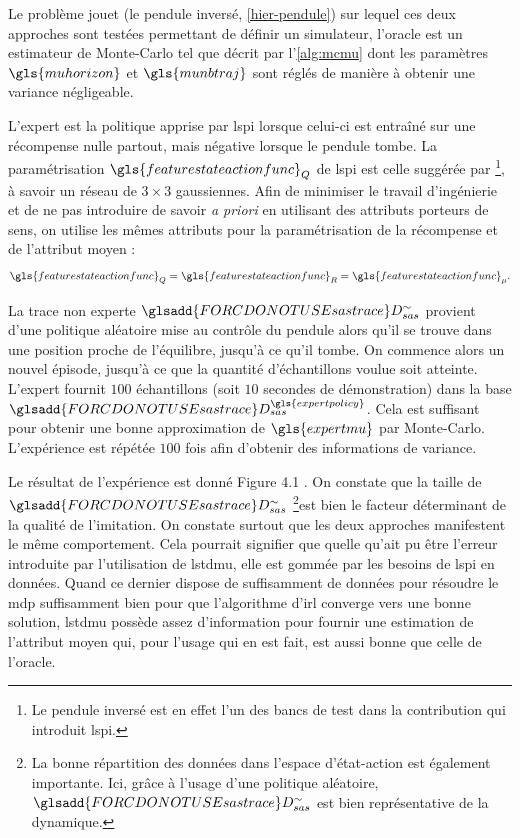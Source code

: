 \documentclass[frenchb,a4paper,justified,notoc]{tufte-book}
\newcommand{\expertmu}{\gls{expertmu}}
\newcommand{\expertpolicy}{\gls{expertpolicy}}
\newcommand{\munbtraj}{\gls{munbtraj}}
\newcommand{\muhorizon}{\gls{muhorizon}}
\newcommand{\featurestateactionfunc}{\gls{featurestateactionfunc}}
\newcommand{\sastrace}[1]{\ensuremath{\glsadd{FORCDONOTUSEsastrace}D_{sas}^{#1}}}
\begin{document}
Le problème jouet (le pendule inversé, \autoref{hier-pendule}) sur lequel ces deux approches sont testées permettant de définir un simulateur, l'oracle est un estimateur de Monte-Carlo tel que décrit par l'\autoref{alg:mcmu} dont les paramètres $\muhorizon$ et $\munbtraj$ sont réglés de manière à obtenir une variance négligeable.

L'expert est la politique apprise par \gls{lspi} lorsque celui-ci est entraîné sur une récompense nulle partout, mais négative lorsque le pendule tombe. La paramétrisation $\featurestateactionfunc_Q$ de \gls{lspi} est celle suggérée par \citet{lagoudakis2003least} \footnote{Le pendule inversé est en effet l'un des bancs de test dans la contribution qui introduit \gls{lspi}.
 }, à savoir un réseau de $3\times 3$ gaussiennes. Afin de minimiser le travail d'ingénierie et de ne pas introduire de savoir \emph{a priori} en utilisant des attributs porteurs de sens, on utilise les mêmes attributs pour la paramétrisation de la récompense et de l'attribut moyen :
\begin{equation}
\featurestateactionfunc_Q = \featurestateactionfunc_R = \featurestateactionfunc_\mu.
\end{equation}

La trace non experte $\sastrace{\sim}$ provient d'une politique aléatoire mise au contrôle du pendule alors qu'il se trouve dans une position proche de l'équilibre, jusqu'à ce qu'il tombe. On commence alors un nouvel épisode, jusqu'à ce que la quantité d'échantillons voulue soit atteinte. L'expert fournit $100$ échantillons (soit $10$ secondes de démonstration) dans la base $\sastrace{\expertpolicy}$. Cela est suffisant pour obtenir une bonne approximation de $\expertmu$ par Monte-Carlo. L'expérience est répétée $100$ fois afin d'obtenir des informations de variance.

 Le résultat de l'expérience est donné Figure 4.1
. On constate que la taille de $\sastrace{\sim}$ \footnote{La bonne répartition des données dans l'espace d'état-action est également importante. Ici, grâce à l'usage d'une politique aléatoire, $\sastrace{\sim}$ est bien représentative de la dynamique.
 }est bien le facteur déterminant de la qualité de l'imitation. On constate surtout que les deux approches manifestent le même comportement. Cela pourrait signifier que quelle qu'ait pu être l'erreur introduite par l'utilisation de \gls{lstdmu}, elle est gommée par les besoins de \gls{lspi} en données. Quand ce dernier dispose de suffisamment de données pour résoudre le \gls{mdp} suffisamment bien pour que l'algorithme d'\gls{irl} converge vers une bonne solution, \gls{lstdmu} possède assez d'information pour fournir une estimation de l'attribut moyen qui, pour l'usage qui en est fait, est aussi bonne que celle de l'oracle.
\end{document}
